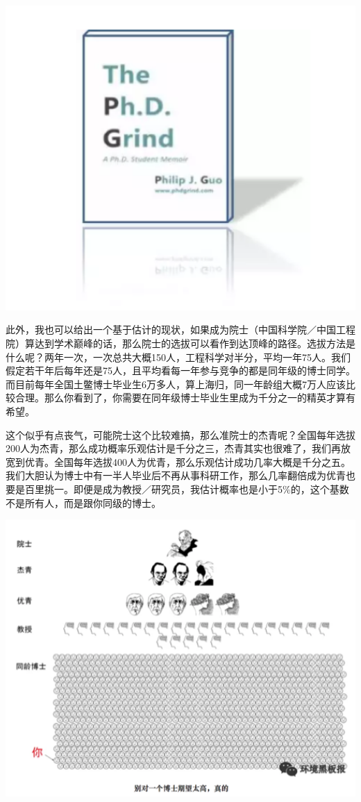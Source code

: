 \documentclass[]{book}
\begin{document}
\includegraphics[width=6.67in]{images/hhcs2}

此外，我也可以给出一个基于估计的现状，如果成为院士（中国科学院／中国工程院）算达到学术巅峰的话，那么院士的选拔可以看作到达顶峰的路径。选拔方法是什么呢？两年一次，一次总共大概150人，工程科学对半分，平均一年75人。我们假定若干年后每年还是75人，且平均看每一年参与竞争的都是同年级的博士同学。而目前每年全国土鳖博士毕业生6万多人，算上海归，同一年龄组大概7万人应该比较合理。那么你看到了，你需要在同年级博士毕业生里成为千分之一的精英才算有希望。

这个似乎有点丧气，可能院士这个比较难搞，那么准院士的杰青呢？全国每年选拔200人为杰青，那么成功概率乐观估计是千分之三，杰青其实也很难了，我们再放宽到优青。全国每年选拔400人为优青，那么乐观估计成功几率大概是千分之五。我们大胆认为博士中有一半人毕业后不再从事科研工作，那么几率翻倍成为优青也要是百里挑一。即便是成为教授／研究员，我估计概率也是小于5\%的，这个基数不是所有人，而是跟你同级的博士。

\includegraphics[width=6.67in]{images/hhcs3}
\end{document}
